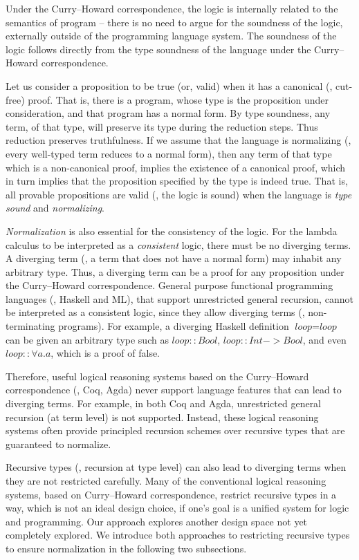 Under the Curry--Howard correspondence, the logic is internally related to the
semantics of program -- there is no need to argue for the soundness of the
logic,  externally outside of the programming language system. The soundness
of the logic follows directly from the type soundness of the language under
the Curry--Howard correspondence.

Let us consider a proposition to be true
(or, valid) when it has a canonical (\ie, cut-free) proof.
That is, there is a program, whose type is the proposition under
consideration, and that program has a normal form. 
By type soundness, any term,
of that type, will preserve its type during the reduction steps. Thus
reduction preserves truthfulness. If we assume
that the language is normalizing (\ie, every well-typed term reduces to
a normal form), then any term of that type which is a non-canonical proof,
implies the existence of a canonical proof, which in turn implies that
the proposition specified by the type is indeed true. That is, all provable
propositions are valid (\ie, the logic is sound) when the language is
\emph{type sound} and \emph{normalizing}.

\emph{Normalization} is also essential for the consistency of the logic.
For the lambda calculus to be interpreted as a \emph{consistent} logic,
there must be no diverging terms. A diverging term (\ie, a term that does
not have a normal form) may inhabit any arbitrary type. Thus, a diverging term
can be a proof for any proposition under the Curry--Howard correspondence.
General purpose functional programming languages (\eg, Haskell and ML), that
support unrestricted general recursion, cannot be interpreted as a consistent
logic, since they allow diverging terms (\ie, non-terminating programs).
For example, a diverging Haskell definition $\textit{loop} = \textit{loop}$
can be given an arbitrary type such as
$\textit{loop}\mathrel{::}\textit{Bool}$,
$\textit{loop}\mathrel{::}\textit{Int} -> \textit{Bool}$,
and even $\textit{loop}\mathrel{::}\forall a. a$, which is a proof of false.


Therefore, useful logical reasoning systems based on the Curry--Howard
correspondence (\eg, Coq, Agda) never support language features that can
lead to diverging terms. For example, in both Coq and Agda,
unrestricted general recursion (at term level) is not supported. 
Instead, these logical reasoning systems
often provide principled recursion schemes over recursive types that are
guaranteed to normalize. 

Recursive types (\ie, recursion at type level)
can also lead to diverging terms when they are not restricted carefully.
Many of the conventional logical reasoning systems, based on
Curry--Howard correspondence, restrict recursive types in a way,
which is not an ideal design choice, if one's goal is a unified system for
logic and programming. Our approach explores another design space not yet
completely explored. We introduce both approaches to restricting recursive
types to ensure normalization in the following two subsections.


